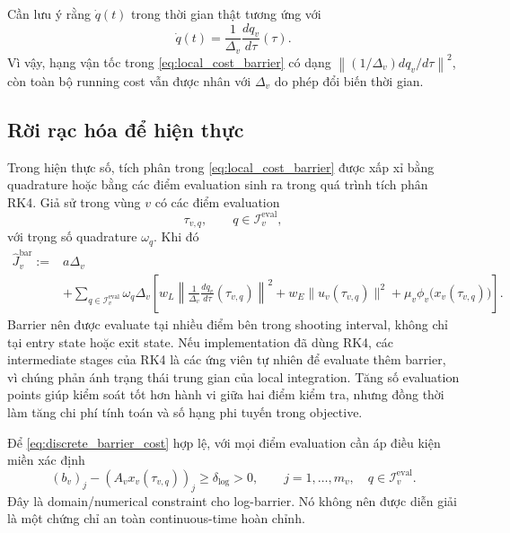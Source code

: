 \documentclass[12pt]{article}
\begin{document}
Cần lưu ý rằng $\dot q(t)$ trong thời gian thật tương ứng với
\begin{equation}
\dot q(t)=\frac{1}{\Delta_v}\frac{dq_v}{d\tau}(\tau).
\label{eq:qdot_scaled}
\end{equation}
Vì vậy, hạng vận tốc trong \eqref{eq:local_cost_barrier} có dạng $\left\|(1/\Delta_v)dq_v/d\tau\right\|^2$, còn toàn bộ running cost vẫn được nhân với $\Delta_v$ do phép đổi biến thời gian.

\subsection{Rời rạc hóa để hiện thực}

Trong hiện thực số, tích phân trong \eqref{eq:local_cost_barrier} được xấp xỉ bằng quadrature hoặc bằng các điểm evaluation sinh ra trong quá trình tích phân RK4. Giả sử trong vùng $v$ có các điểm evaluation
\begin{equation}
\tau_{v,q},\qquad q\in\mathcal I_v^{\mathrm{eval}},
\label{eq:evaluation_points}
\end{equation}
với trọng số quadrature $\omega_q$. Khi đó
\begin{equation}
\begin{aligned}
\widehat J_v^{\mathrm{bar}}
:={}& a\Delta_v \\
&+\sum_{q\in\mathcal I_v^{\mathrm{eval}}}\omega_q\Delta_v
\left[
w_L\left\|\frac{1}{\Delta_v}\frac{dq_v}{d\tau}(\tau_{v,q})\right\|^2
+w_E\|u_v(\tau_{v,q})\|^2
+\mu_v\phi_v\bigl(x_v(\tau_{v,q})\bigr)
\right].
\end{aligned}
\label{eq:discrete_barrier_cost}
\end{equation}
Barrier nên được evaluate tại nhiều điểm bên trong shooting interval, không chỉ tại entry state hoặc exit state. Nếu implementation đã dùng RK4, các intermediate stages của RK4 là các ứng viên tự nhiên để evaluate thêm barrier, vì chúng phản ánh trạng thái trung gian của local integration. Tăng số evaluation points giúp kiểm soát tốt hơn hành vi giữa hai điểm kiểm tra, nhưng đồng thời làm tăng chi phí tính toán và số hạng phi tuyến trong objective.

Để \eqref{eq:discrete_barrier_cost} hợp lệ, với mọi điểm evaluation cần áp điều kiện miền xác định
\begin{equation}
(b_v)_j-(A_vx_v(\tau_{v,q}))_j\ge \delta_{\log}>0,
\qquad
j=1,\dots,m_v,
\quad q\in\mathcal I_v^{\mathrm{eval}}.
\label{eq:discrete_domain_barrier_again}
\end{equation}
Đây là domain/numerical constraint cho log-barrier. Nó không nên được diễn giải là một chứng chỉ an toàn continuous-time hoàn chỉnh.
\end{document}
